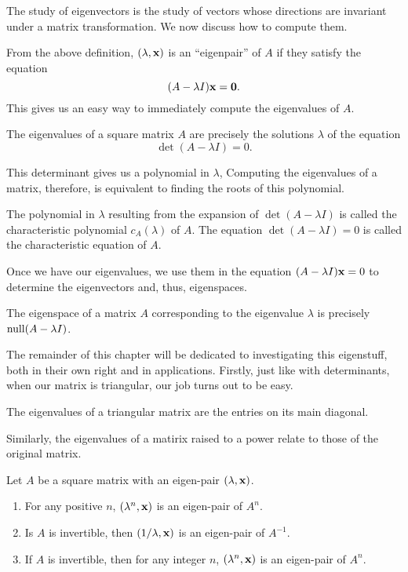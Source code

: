 \documentclass[../m073main.tex]{subfiles}
\begin{document}
The study of eigenvectors is the study of vectors whose directions are invariant under a matrix transformation.
We now discuss how to compute them.

From the above definition, $(\lambda, \mathbf{x})$ is an ``eigenpair'' of $A$ if they satisfy the equation
\[ (A - \lambda I) \mathbf{x} = \mathbf{0}. \]
This gives us an easy way to immediately compute the eigenvalues of $A$.

\begin{theorem}
	The eigenvalues of a square matrix $A$ are precisely the solutions $\lambda$ of the equation
	\[ \det (A - \lambda I) = 0. \]
\end{theorem}

This determinant gives us a polynomial in $\lambda$,
Computing the eigenvalues of a matrix, therefore, is equivalent to finding the roots of this polynomial.

\begin{definition}
	The polynomial in $\lambda$ resulting from the expansion of $\det (A - \lambda I)$ is called the characteristic polynomial $c_A (\lambda)$ of $A$.
	The equation $\det (A - \lambda I) = 0$ is called the characteristic equation of $A$.
\end{definition}

Once we have our eigenvalues, we use them in the equation $(A - \lambda I) \mathbf{x} = 0$ to determine the eigenvectors and, thus, eigenspaces.

\begin{theorem}
	The eigenspace of a matrix $A$ corresponding to the eigenvalue $\lambda$ is precisely $\textrm{null} (A - \lambda I)$.
\end{theorem}

The remainder of this chapter will be dedicated to investigating this eigenstuff, both in their own right and in applications.
Firstly, just like with determinants, when our matrix is triangular, our job turns out to be easy.

\begin{theorem}
	The eigenvalues of a triangular matrix are the entries on its main diagonal.
\end{theorem}

Similarly, the eigenvalues of a matirix raised to a power relate to those of the original matrix.

\begin{theorem}
	Let $A$ be a square matrix with an eigen-pair $(\lambda, \mathbf{x})$.
	\begin{enumerate}[label=(\alph*)]
		\item For any positive $n$, $(\lambda^n, \mathbf{x})$ is an eigen-pair of $A^n$.
		\item Is $A$ is invertible, then $(1/\lambda, \mathbf{x})$ is an eigen-pair of $A^{-1}$.
		\item If $A$ is invertible, then for any integer $n$, $(\lambda^n, \mathbf{x})$ is an eigen-pair of $A^n$.
	\end{enumerate}
\end{theorem}
\end{document}
